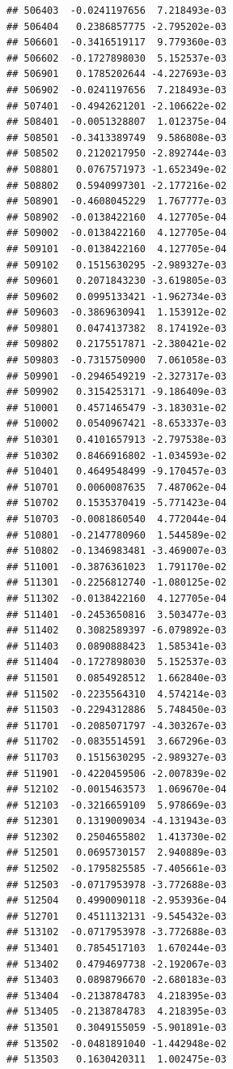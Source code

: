 \documentclass[ignorenonframetext,]{beamer}
\begin{document}
\begin{frame}[fragile]
\begin{verbatim}
## 506403  -0.0241197656  7.218493e-03
## 506404   0.2386857775 -2.795202e-03
## 506601  -0.3416519117  9.779360e-03
## 506602  -0.1727898030  5.152537e-03
## 506901   0.1785202644 -4.227693e-03
## 506902  -0.0241197656  7.218493e-03
## 507401  -0.4942621201 -2.106622e-02
## 508401  -0.0051328807  1.012375e-04
## 508501  -0.3413389749  9.586808e-03
## 508502   0.2120217950 -2.892744e-03
## 508801   0.0767571973 -1.652349e-02
## 508802   0.5940997301 -2.177216e-02
## 508901  -0.4608045229  1.767777e-03
## 508902  -0.0138422160  4.127705e-04
## 509002  -0.0138422160  4.127705e-04
## 509101  -0.0138422160  4.127705e-04
## 509102   0.1515630295 -2.989327e-03
## 509601   0.2071843230 -3.619805e-03
## 509602   0.0995133421 -1.962734e-03
## 509603  -0.3869630941  1.153912e-02
## 509801   0.0474137382  8.174192e-03
## 509802   0.2175517871 -2.380421e-02
## 509803  -0.7315750900  7.061058e-03
## 509901  -0.2946549219 -2.327317e-03
## 509902   0.3154253171 -9.186409e-03
## 510001   0.4571465479 -3.183031e-02
## 510002   0.0540967421 -8.653337e-03
## 510301   0.4101657913 -2.797538e-03
## 510302   0.8466916802 -1.034593e-02
## 510401   0.4649548499 -9.170457e-03
## 510701   0.0060087635  7.487062e-04
## 510702   0.1535370419 -5.771423e-04
## 510703  -0.0081860540  4.772044e-04
## 510801  -0.2147780960  1.544589e-02
## 510802  -0.1346983481 -3.469007e-03
## 511001  -0.3876361023  1.791170e-02
## 511301  -0.2256812740 -1.080125e-02
## 511302  -0.0138422160  4.127705e-04
## 511401  -0.2453650816  3.503477e-03
## 511402   0.3082589397 -6.079892e-03
## 511403   0.0890888423  1.585341e-03
## 511404  -0.1727898030  5.152537e-03
## 511501   0.0854928512  1.662840e-03
## 511502  -0.2235564310  4.574214e-03
## 511503  -0.2294312886  5.748450e-03
## 511701  -0.2085071797 -4.303267e-03
## 511702  -0.0835514591  3.667296e-03
## 511703   0.1515630295 -2.989327e-03
## 511901  -0.4220459506 -2.007839e-02
## 512102  -0.0015463573  1.069670e-04
## 512103  -0.3216659109  5.978669e-03
## 512301   0.1319009034 -4.131943e-03
## 512302   0.2504655802  1.413730e-02
## 512501   0.0695730157  2.940889e-03
## 512502  -0.1795825585 -7.405661e-03
## 512503  -0.0717953978 -3.772688e-03
## 512504   0.4990090118 -2.953936e-04
## 512701   0.4511132131 -9.545432e-03
## 513102  -0.0717953978 -3.772688e-03
## 513401   0.7854517103  1.670244e-03
## 513402   0.4794697738 -2.192067e-03
## 513403   0.0898796670 -2.680183e-03
## 513404  -0.2138784783  4.218395e-03
## 513405  -0.2138784783  4.218395e-03
## 513501   0.3049155059 -5.901891e-03
## 513502  -0.0481891040 -1.442948e-02
## 513503   0.1630420311  1.002475e-03

\end{verbatim}
\end{frame}
\end{document}
